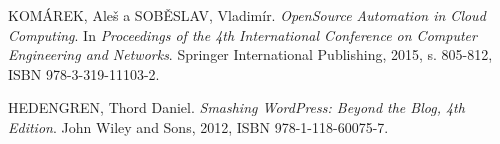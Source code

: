 \begin{thebibliography}{10}

KOMÁREK, Aleš a SOBĚSLAV, Vladimír. \textit{OpenSource Automation in Cloud Computing}. In \textit{Proceedings of the 4th International Conference on Computer Engineering and Networks}. Springer International Publishing, 2015, s. 805-812, ISBN 978-3-319-11103-2.

HEDENGREN, Thord Daniel. \textit{Smashing WordPress: Beyond the Blog, 4th Edition}. John Wiley and Sons, 2012, ISBN 978-1-118-60075-7.

\end{thebibliography}